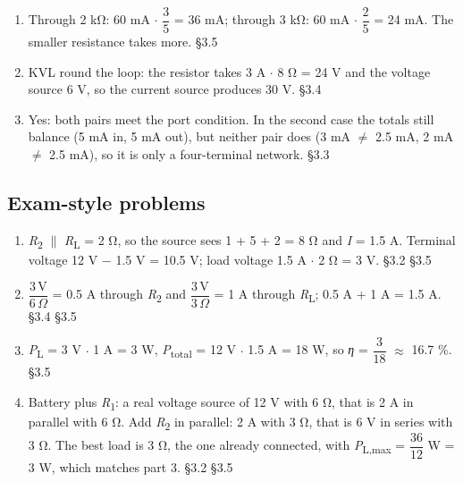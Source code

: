 \documentclass[11pt]{article}
\begin{document}
\begin{keepsection}
\begin{enumerate}
\item Through 2 kΩ: 60 mA \ensuremath{\cdot} {\small\ensuremath{\dfrac{3}{5}}} = 36 mA; through 3 kΩ: 60 mA \ensuremath{\cdot} {\small\ensuremath{\dfrac{2}{5}}} = 24 mA. The smaller resistance takes more. \hfill{\small\color{FAUblue}§3.5}
\item KVL round the loop: the resistor takes 3 A \ensuremath{\cdot} 8 Ω = 24 V and the voltage source 6 V, so the current source produces 30 V. \hfill{\small\color{FAUblue}§3.4}
\item Yes: both pairs meet the port condition. In the second case the totals still balance (5 mA in, 5 mA out), but neither pair does (3 mA \ensuremath{\neq} 2.5 mA, 2 mA \ensuremath{\neq} 2.5 mA), so it is only a four-terminal network. \hfill{\small\color{FAUblue}§3.3}
\end{enumerate}

\end{keepsection}
\begin{keepsection}\subsection{Exam-style problems}

\begin{enumerate}
\item \textit{R}\textsubscript{2} \ensuremath{\parallel} \textit{R}\textsubscript{L} = 2 Ω, so the source sees 1 + 5 + 2 = 8 Ω and \textit{I} = 1.5 A. Terminal voltage 12 V \ensuremath{-} 1.5 V = 10.5 V; load voltage 1.5 A \ensuremath{\cdot} 2 Ω = 3 V. \hfill{\small\color{FAUblue}§3.2} \hfill{\small\color{FAUblue}§3.5}
\item {\small\ensuremath{\dfrac{3\, \mathrm{V}}{6\, Ω}}} = 0.5 A through \textit{R}\textsubscript{2} and {\small\ensuremath{\dfrac{3\, \mathrm{V}}{3\, Ω}}} = 1 A through \textit{R}\textsubscript{L}; 0.5 A + 1 A = 1.5 A. \hfill{\small\color{FAUblue}§3.4} \hfill{\small\color{FAUblue}§3.5}
\item \textit{P}\textsubscript{L} = 3 V \ensuremath{\cdot} 1 A = 3 W, \textit{P}\textsubscript{total} = 12 V \ensuremath{\cdot} 1.5 A = 18 W, so \textit{η} = {\small\ensuremath{\dfrac{3}{18}}} \ensuremath{\approx} 16.7 \%. \hfill{\small\color{FAUblue}§3.5}
\item Battery plus \textit{R}\textsubscript{1}: a real voltage source of 12 V with 6 Ω, that is 2 A in parallel with 6 Ω. Add \textit{R}\textsubscript{2} in parallel: 2 A with 3 Ω, that is 6 V in series with 3 Ω. The best load is 3 Ω, the one already connected, with \textit{P}\textsubscript{L,max} = {\small\ensuremath{\dfrac{36}{12}}} W = 3 W, which matches part 3. \hfill{\small\color{FAUblue}§3.2} \hfill{\small\color{FAUblue}§3.5}
\end{enumerate}

\end{keepsection}
\end{document}
